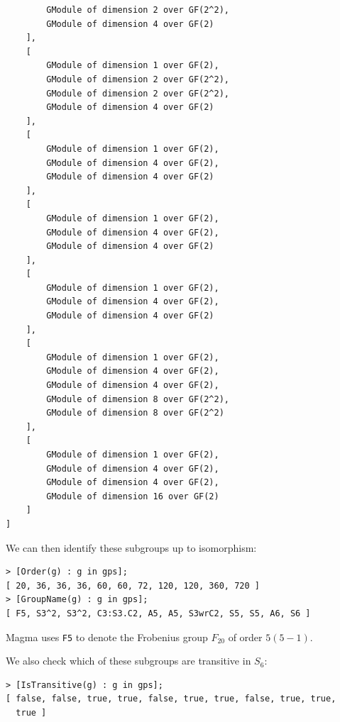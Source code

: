 \documentclass{amsart}
\theoremstyle{definition}
\begin{document}
\begin{verbatim}
        GModule of dimension 2 over GF(2^2),
        GModule of dimension 4 over GF(2)
    ],
    [
        GModule of dimension 1 over GF(2),
        GModule of dimension 2 over GF(2^2),
        GModule of dimension 2 over GF(2^2),
        GModule of dimension 4 over GF(2)
    ],
    [
        GModule of dimension 1 over GF(2),
        GModule of dimension 4 over GF(2),
        GModule of dimension 4 over GF(2)
    ],
    [
        GModule of dimension 1 over GF(2),
        GModule of dimension 4 over GF(2),
        GModule of dimension 4 over GF(2)
    ],
    [
        GModule of dimension 1 over GF(2),
        GModule of dimension 4 over GF(2),
        GModule of dimension 4 over GF(2)
    ],
    [
        GModule of dimension 1 over GF(2),
        GModule of dimension 4 over GF(2),
        GModule of dimension 4 over GF(2),
        GModule of dimension 8 over GF(2^2),
        GModule of dimension 8 over GF(2^2)
    ],
    [
        GModule of dimension 1 over GF(2),
        GModule of dimension 4 over GF(2),
        GModule of dimension 4 over GF(2),
        GModule of dimension 16 over GF(2)
    ]
]
\end{verbatim}

We can then identify these subgroups up to isomorphism:

\begin{verbatim}
> [Order(g) : g in gps];
[ 20, 36, 36, 36, 60, 60, 72, 120, 120, 360, 720 ]
> [GroupName(g) : g in gps];
[ F5, S3^2, S3^2, C3:S3.C2, A5, A5, S3wrC2, S5, S5, A6, S6 ]
\end{verbatim}

Magma uses \texttt{F5} to denote the Frobenius group $F_{20}$ of order $5(5-1)$.

We also check which of these subgroups are transitive in $S_6$:

\begin{verbatim}
> [IsTransitive(g) : g in gps];
[ false, false, true, true, false, true, true, false, true, true,
  true ]
\end{verbatim}
\end{document}
